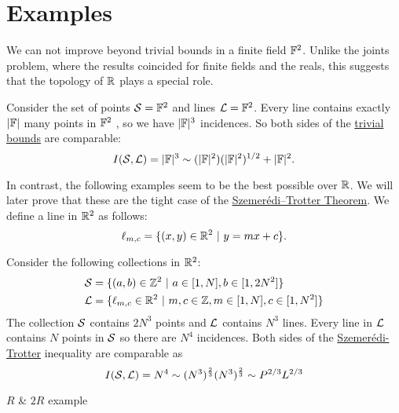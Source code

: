 \section{Examples}
We can not improve beyond trivial bounds in a finite field $\mathbb F^2$. Unlike the joints problem, where the results coincided for finite fields and the reals,
this suggests that the topology of $\mathbb R$ plays a special role. 
\begin{example}
Consider the set of points $\mathcal S=\mathbb F^2$ and lines 
$\mathcal L = \mathbb F^2$. Every line contains exactly $|\mathbb F|$ many points in $\mathbb F^2$ , so we have $|\mathbb F|^3$ incidences. 
So both sides of the \hyperref[thm:trivial-ST-bounds]{trivial bounds} are comparable:
$$
I(\mathcal S,\mathcal L) = |\mathbb F|^3 \sim (|\mathbb F|^2)(|\mathbb F|^2)^{1/2} + |\mathbb F|^2.
$$
\end{example}
In contrast, the following examples seem to be the best possible over $\mathbb R$. We will later prove that these are the tight case of the \hyperref[thm:S-T]{Szemerédi–Trotter Theorem}.
We define a line in $\mathbb R^2$ as follows:
\[
    \ell_{m,c} = \{(x,y) \in \mathbb R^2 \ | \ y = mx+c\}.     
\]
\begin{example}
    Consider the following collections in $\mathbb R^2$:
    \begin{align*}
    \mathcal S &= \{ (a,b) \in \mathbb Z^2 \ | \ a\in [1,N], b \in [1,2N^2] \} \\
    \mathcal L &= \{ \ell_{m,c} \in \mathbb R^2 \ | \ m,c\in \mathbb Z, m\in [1,N], c \in [1,N^2] \} \end{align*}
    The collection $\mathcal S$ contains $2N^3$ points and $\mathcal L$ contains $N^3$ lines. Every line in $\mathcal L$ contains $N$ points in $\mathcal S$ so there are
    $N^4$ incidences. Both sides of the \hyperref[thm:S-T]{Szemerédi-Trotter} inequality are comparable as 
    $$ I(\mathcal S,\mathcal L) = N^4 \sim (N^3)^{\frac{2}{3}} (N^3)^{\frac{2}{3}} \sim P^{2/3} L^{2/3}$$
\end{example}
\begin{example}
    $R$ \& $2R$ example
\end{example}



